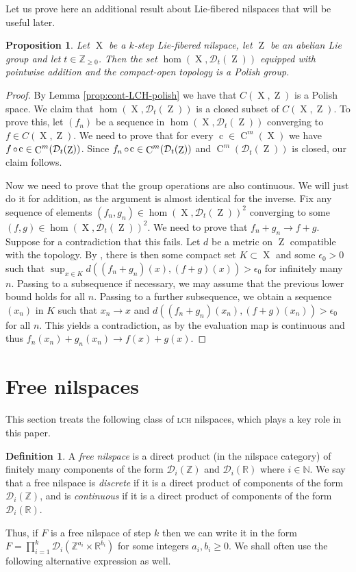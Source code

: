 \documentclass[a4paper,12pt,reqno]{amsart}
\newtheorem{proposition}[theorem]{Proposition}
\theoremstyle{definition}
\newtheorem{defn}[theorem]{Definition}
\def\to{\rightarrow}
\newcommand{\mc}{\mathcal}
\newcommand{\mb}{\mathbb}
\DeclareMathOperator{\ab}{Z}
\DeclareMathOperator{\q}{c}
\DeclareMathOperator{\ns}{X}
\DeclareMathOperator{\co}{\circ\hspace{-0.02 cm}}
\DeclareMathOperator{\cu}{C}
\begin{document}
Let us prove here an additional result about Lie-fibered nilspaces that will be useful later.

\begin{proposition}\label{prop:hom-ns-z-polish}
Let $\ns$ be a $k$-step Lie-fibered nilspace, let $\ab$ be an abelian Lie group and let $t\in \mb{Z}_{\ge 0}$. Then the set $\hom(\ns,\mc{D}_t(\ab))$ equipped with pointwise addition and the compact-open topology is a Polish group.
\end{proposition}

\begin{proof}
By Lemma \ref{prop:cont-LCH-polish} we have that $C(\ns,\ab)$ is a Polish space. We claim that $\hom(\ns,\mc{D}_t(\ab))$ is a closed subset of $C(\ns,\ab)$. To prove this, let $(f_n)$ be a sequence in $\hom(\ns,\mc{D}_t(\ab))$ converging to $f\in C(\ns,\ab)$. We need to prove that for every $\q\in \cu^m(\ns)$ we have $f\co \q\in \cu^m(\mc{D}_t(\ab))$. Since $f_n\co\q\in \cu^m(\mc{D}_t(\ab))$ and $\cu^m(\mc{D}_t(\ab))$ is closed, our claim follows.

Now we need to prove that the group operations are also continuous. We will just do it for addition, as the argument is almost identical for the inverse. Fix any sequence of elements $(f_n,g_n)\in \hom(\ns,\mc{D}_t(\ab))^2$ converging to some $(f,g)\in \hom(\ns,\mc{D}_t(\ab))^2$. We need to prove that $f_n+g_n\to f+g$. Suppose for a contradiction that this fails. Let $d$ be a  metric on $\ab$ compatible with the topology. By \cite[Theorems 46.8 and 46.2]{Mu}, there is then some compact set $K\subset \ns$ and some $\epsilon_0>0$ such that $\sup_{x\in K} d((f_n+g_n)(x),(f+g)(x))>\epsilon_0$ for infinitely many $n$. Passing to a subsequence if necessary, we may assume that the previous lower bound holds for all $n$. Passing to a further subsequence, we obtain a sequence $(x_n)$ in $K$ such that $x_n\to x$ and $ d((f_n+g_n)(x_n),(f+g)(x_n))>\epsilon_0$ for all $n$. This yields a contradiction, as by \cite[Theorem 46.10]{Mu} the evaluation map is continuous and thus $f_n(x_n)+g_n(x_n)\to f(x)+g(x)$.
\end{proof}

\section{Free nilspaces}\label{sec:freenilspaces}
\noindent This section treats the following class of \textsc{lch} nilspaces, which plays a key role in this paper.

\begin{defn}\label{def:free-nil}
A \emph{free nilspace} is a direct product (in the nilspace category) of finitely many components of the form $\mc{D}_i(\mb{Z})$ and $\mc{D}_i(\mb{R})$ where $i\in \mb{N}$. We say that a free nilspace is \emph{discrete} if it is a direct product of components of the form $\mathcal{D}_i(\mathbb{Z})$, and is \emph{continuous} if it is a direct product of components of the form $\mc{D}_i(\mb{R})$.
\end{defn}
\noindent Thus, if $F$ is a free nilspace of step $k$ then we can write it in the form $F=\prod_{i=1}^k \mc{D}_i(\mb{Z}^{a_i}\times \mb{R}^{b_i})$ for some integers $a_i,b_i\ge 0$. We shall often use the following alternative expression as well.
\end{document}
